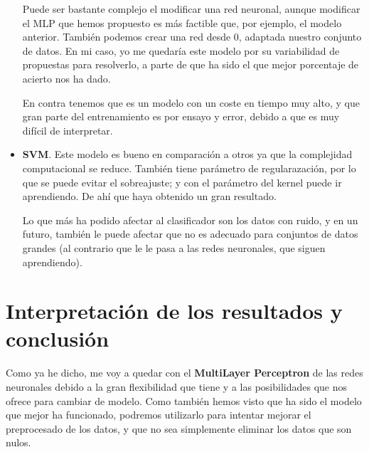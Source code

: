 \documentclass[11pt,a4paper]{article}
\begin{document}
\begin{itemize}
          Puede ser bastante complejo el modificar una red neuronal, aunque modificar el MLP que hemos propuesto es más factible
          que, por ejemplo, el modelo anterior. También podemos crear una red desde 0, adaptada nuestro conjunto de datos. En
          mi caso, yo me quedaría este modelo por su variabilidad de propuestas para resolverlo, a parte de que ha sido el que
          mejor porcentaje de acierto nos ha dado.

          En contra tenemos que es un modelo con un coste en tiempo muy alto, y que gran parte del entrenamiento es por ensayo
          y error, debido a que es muy difícil de interpretar.

    \item \textbf{SVM}. Este modelo es bueno en comparación a otros ya que la complejidad computacional se reduce. También
          tiene parámetro de regularazación, por lo que se puede evitar el sobreajuste; y con el parámetro del kernel puede
          ir aprendiendo. De ahí que haya obtenido un gran resultado.

          Lo que más ha podido afectar al clasificador son los datos con ruido, y en un futuro, también le puede afectar que
          no es adecuado para conjuntos de datos grandes (al contrario que le le pasa a las redes neuronales, que siguen
          aprendiendo).
\end{itemize}



\section{Interpretación de los resultados y conclusión}
Como ya he dicho, me voy a quedar con el \textbf{MultiLayer Perceptron} de las redes neuronales debido a la gran flexibilidad
que tiene y a las posibilidades que nos ofrece para cambiar de modelo. Como también hemos visto que ha sido el modelo que mejor
ha funcionado, podremos utilizarlo para intentar mejorar el preprocesado de los datos, y que no sea simplemente eliminar los
datos que son nulos.
\end{document}
